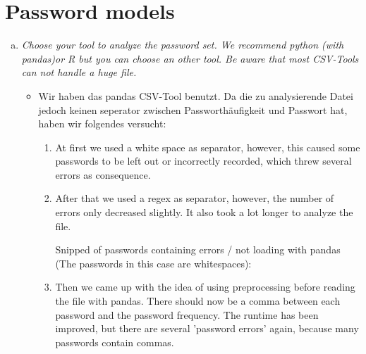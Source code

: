 
\graphicspath{ {./src/} } 
\usepackage{hyperref}

\newcommand{\dozent}{Volker Roth}
\newcommand{\tutor}{Oliver Wiese}
\newcommand{\tutoriumNo}{02\\Materialien: Latex, VSC, Skript}
\newcommand{\ubungNo}{03}
\newcommand{\veranstaltung}{Rechnersicherheit}
\newcommand{\semester}{SoSe 21}




\section{Password models}
\begin{enumerate}[(a)]
    \item {\itshape Choose your tool to analyze the password set. We recommend python (with pandas)or R but you can choose an other tool. Be aware that most CSV-Tools can not handle a huge file.}
    \begin{itemize}
        \item Wir haben das pandas CSV-Tool benutzt. Da die zu analysierende Datei jedoch keinen seperator zwischen Passworthäufigkeit und Passwort hat, haben wir folgendes versucht:
        \begin{enumerate}[1.]
            \item At first we used a white space as separator, however, this caused some passwords to be left out or incorrectly recorded, which threw several errors as consequence.
            	
            
            \item After that we used a regex as separator, however, the number of errors only decreased slightly. It also took a lot longer to analyze the file. 
            
            Snipped of passwords containing errors / not loading with pandas (The passwords in this case are whitespaces):
            
\newpage            
            \item Then we came up with the idea of using preprocessing before reading the file with pandas. There should now be a comma between each password and the password frequency. The runtime has been improved, but there are several 'password errors' again, because many passwords contain commas.
            
 

\end{enumerate}
\end{itemize}
\end{enumerate}
